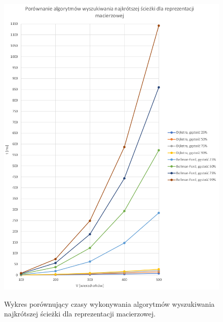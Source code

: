 \documentclass[a4paper,12pt]{article}
\begin{document}
\begin{figure}[H]
	\centering
	\caption{\centering Wykres porównujący czasy wykonywania algorytmów wyszukiwania najkrótszej ścieżki dla reprezentacji macierzowej.}
	\includegraphics[width=14cm]{fig4.png}
	\label{fig.wykres-macierz-shortpath}
\end{figure}
\end{document}
